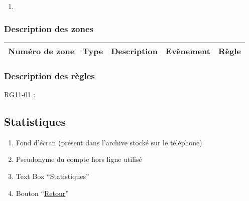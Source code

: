 \documentclass{report}
\begin{document}
		\hypertarget{Modifier le mot de passe du compte multi-joueurs}{}
		\label{Modifier le mot de passe du compte multi-joueurs}
			
		\begin{center}
			
		\end{center}
		
		\begin{enumerate}
		  \item 
		\end{enumerate}

		\subsubsection{Description des zones}
		
			\begin{tabular}{|c|c|c|c|c|} \hline
				Numéro de zone & Type  & Description & Evènement &	Règle \\\hline
			\end{tabular}
			
		\subsubsection{Description des règles}

			\underline{RG11-01 :}
				\begin{quote}

				\end{quote}
				
				
\newpage

	\subsection{Statistiques}
		
		\hypertarget{Statistiques}{}
		\label{Statistiques}
			
		\begin{center}
			
		\end{center}
		
		\begin{enumerate}
		  \item Fond d'écran (présent dans l'archive stocké sur le téléphone)
		  \item Pseudonyme du compte hors ligne utilisé
		  \item Text Box ``Statistiques''
		  \item Bouton ``\hyperlink{Accueil}{Retour}''
		\end{enumerate}
\end{document}
